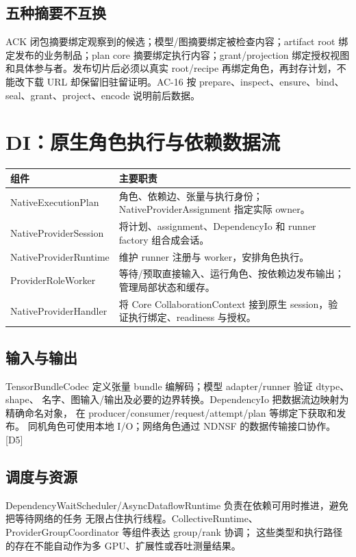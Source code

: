 \subsection{五种摘要不互换}
ACK 闭包摘要绑定观察到的候选；模型/图摘要绑定被检查内容；artifact root 绑定发布的业务制品；plan core 摘要绑定执行内容；grant/projection 绑定授权视图和具体参与者。发布切片后必须以真实 root/recipe 再绑定角色，再封存计划，不能改下载 URL 却保留旧驻留证明。AC-16 按 prepare、inspect、ensure、bind、seal、grant、project、encode 说明前后数据。

\newpage

\section{DI：原生角色执行与依赖数据流}
\begin{tabularx}{\linewidth}{@{}p{43mm}X@{}}
\toprule
组件 & 主要职责 \\
\midrule
NativeExecutionPlan & 角色、依赖边、张量与执行身份；NativeProviderAssignment 指定实际 owner。\\
NativeProviderSession & 将计划、assignment、DependencyIo 和 runner factory 组合成会话。\\
NativeProviderRuntime & 维护 runner 注册与 worker，安排角色执行。\\
ProviderRoleWorker & 等待/预取直接输入、运行角色、按依赖边发布输出；管理局部状态和缓存。\\
NativeProviderHandler & 将 Core CollaborationContext 接到原生 session，验证执行绑定、readiness 与授权。\\
\bottomrule
\end{tabularx}

\subsection{输入与输出}
TensorBundleCodec 定义张量 bundle 编解码；模型 adapter/runner 验证 dtype、shape、
名字、图输入/输出及必要的边界转换。DependencyIo 把数据流边映射为精确命名对象，
在 producer/consumer/request/attempt/plan 等绑定下获取和发布。
同机角色可使用本地 I/O；网络角色通过 NDNSF 的数据传输接口协作。[D5]

\subsection{调度与资源}
DependencyWaitScheduler/AsyncDataflowRuntime 负责在依赖可用时推进，避免把等待网络的任务
无限占住执行线程。CollectiveRuntime、ProviderGroupCoordinator 等组件表达 group/rank 协调；
这些类型和执行路径的存在不能自动作为多 GPU、扩展性或吞吐测量结果。


